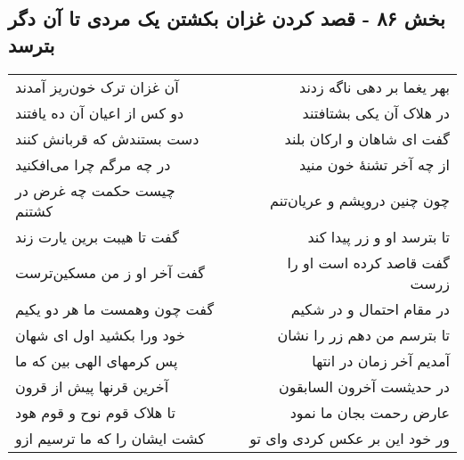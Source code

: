 \begin{center}
\section*{بخش ۸۶ - قصد کردن غزان بکشتن یک مردی تا آن دگر بترسد}
\label{sec:sh086}
\begin{longtable}{l p{0.5cm} r}
آن غزان ترک خون‌ریز آمدند
&&
بهر یغما بر دهی ناگه زدند
\\
دو کس از اعیان آن ده یافتند
&&
در هلاک آن یکی بشتافتند
\\
دست بستندش که قربانش کنند
&&
گفت ای شاهان و ارکان بلند
\\
در چه مرگم چرا می‌افکنید
&&
از چه آخر تشنهٔ خون منید
\\
چیست حکمت چه غرض در کشتنم
&&
چون چنین درویشم و عریان‌تنم
\\
گفت تا هیبت برین یارت زند
&&
تا بترسد او و زر پیدا کند
\\
گفت آخر او ز من مسکین‌ترست
&&
گفت قاصد کرده است او را زرست
\\
گفت چون وهمست ما هر دو یکیم
&&
در مقام احتمال و در شکیم
\\
خود ورا بکشید اول ای شهان
&&
تا بترسم من دهم زر را نشان
\\
پس کرمهای الهی بین که ما
&&
آمدیم آخر زمان در انتها
\\
آخرین قرنها پیش از قرون
&&
در حدیثست آخرون السابقون
\\
تا هلاک قوم نوح و قوم هود
&&
عارض رحمت بجان ما نمود
\\
کشت ایشان را که ما ترسیم ازو
&&
ور خود این بر عکس کردی وای تو
\\
\end{longtable}
\end{center}
